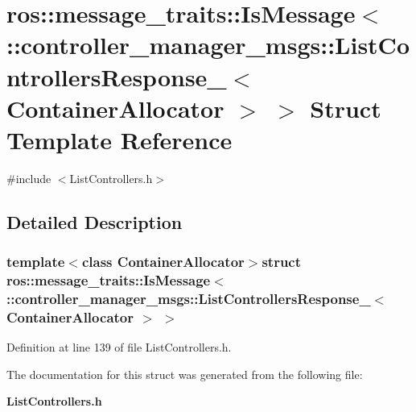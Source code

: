 \section{ros\-:\-:message\-\_\-traits\-:\-:\-Is\-Message$<$ \-:\-:controller\-\_\-manager\-\_\-msgs\-:\-:\-List\-Controllers\-Response\-\_\-$<$ \-Container\-Allocator $>$ $>$ \-Struct \-Template \-Reference}
\label{structros_1_1message__traits_1_1IsMessage_3_01_1_1controller__manager__msgs_1_1ListControllersRe559c27ea80b81d21ea691faaeb6eb351}


{\ttfamily \#include $<$\-List\-Controllers.\-h$>$}



\subsection{\-Detailed \-Description}
\subsubsection*{template$<$class Container\-Allocator$>$struct ros\-::message\-\_\-traits\-::\-Is\-Message$<$ \-::controller\-\_\-manager\-\_\-msgs\-::\-List\-Controllers\-Response\-\_\-$<$ Container\-Allocator $>$ $>$}



\-Definition at line 139 of file \-List\-Controllers.\-h.



\-The documentation for this struct was generated from the following file\-:\begin{DoxyCompactItemize}
\item 
{\bf \-List\-Controllers.\-h}\end{DoxyCompactItemize}
